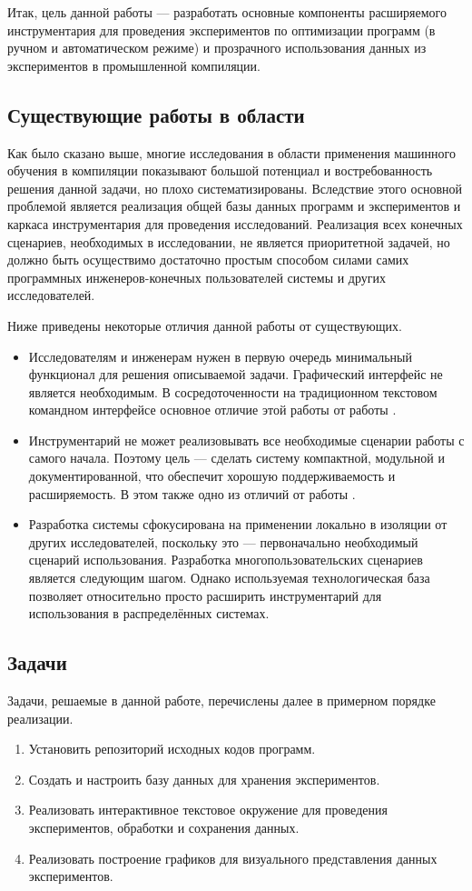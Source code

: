 Итак, цель данной работы --- разработать основные компоненты расширяемого инструментария для проведения экспериментов по оптимизации программ (в ручном и автоматическом режиме) и прозрачного использования данных из экспериментов в промышленной компиляции.


\subsection{Существующие работы в области}
Как было сказано выше, многие исследования в области применения машинного обучения в компиляции \cite{Dubach2009PCO,Thomson2009RTT,Stephenson2003MOI} показывают большой потенциал и востребованность решения данной задачи, но плохо систематизированы. Вследствие этого основной проблемой является реализация общей базы данных программ и экспериментов и каркаса инструментария для проведения исследований. Реализация всех конечных сценариев, необходимых в исследовании, не является приоритетной задачей, но должно быть осуществимо достаточно простым способом силами самих программных инженеров-конечных пользователей системы и других исследователей.

Ниже приведены некоторые отличия данной работы от существующих.
\begin{itemize}
    \item Исследователям и инженерам нужен в первую очередь минимальный функционал для решения описываемой задачи. Графический интерфейс не является необходимым. В сосредоточенности на традиционном текстовом командном интерфейсе основное отличие этой работы от работы \cite{Fursin2010COP}.
    \item Инструментарий не может реализовывать все необходимые сценарии работы с самого начала. Поэтому цель --- сделать систему компактной, модульной и документированной, что обеспечит хорошую поддерживаемость и расширяемость. В этом также одно из отличий от работы \cite{Fursin2010COP}.
    \item Разработка системы сфокусирована на применении локально в изоляции от других исследователей, поскольку это --- первоначально необходимый сценарий использования. Разработка многопользовательских сценариев является следующим шагом. Однако используемая технологическая база позволяет относительно просто расширить инструментарий для использования в распределённых системах.
\end{itemize}


\subsection{Задачи}
Задачи, решаемые в данной работе, перечислены далее в примерном порядке реализации.
\begin{enumerate}
    \item Установить репозиторий исходных кодов программ.
    \item Создать и настроить базу данных для хранения экспериментов.
    \item Реализовать интерактивное текстовое окружение для проведения экспериментов, обработки и сохранения данных.
    \item Реализовать построение графиков для визуального представления данных экспериментов.
\end{enumerate}